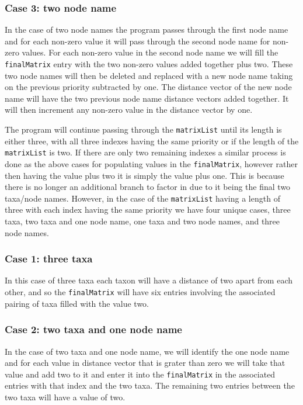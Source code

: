 \documentclass{article}
\begin{document}
\subsubsection{Case 3: two node name}
In the case of two node names the program passes through the first node name and for each non-zero value it will pass through the second node name for non-zero values. For each non-zero value in the second node name we will fill the {\tt finalMatrix} entry with the two non-zero values added together plus two. These two node names will then be deleted and replaced with a new node name taking on the previous priority subtracted by one. The distance vector of the new node name will have the two previous node name distance vectors added together. It will then increment any non-zero value in the distance vector by one. 

The program will continue passing through the {\tt matrixList} until its length is either three, with all three indexes having the same priority or if the length of the {\tt matrixList} is two. If there are only two remaining indexes a similar process is done as the above cases for populating values in the {\tt finalMatrix}, however rather then having the value plus two it is simply the value plus one. This is because there is no longer an additional branch to factor in due to it being the final two taxa/node names. 
However, in the case of the {\tt matrixList} having a length of three with each index having the same priority we have four unique cases, three taxa, two taxa and one node name, one taxa and two node names, and three node names. 

\subsubsection{Case 1: three taxa}

In this case of three taxa each taxon will have a distance of two apart from each other, and so the {\tt finalMatrix} will have six entries involving the associated pairing of taxa filled with the value two.

\subsubsection{Case 2: two taxa and one node name}

In the case of two taxa and one node name, we will identify the one node name and for each value in distance vector that is grater than zero we will take that value and add two to it and enter it into the {\tt finalMatrix} in the associated entries with that index and the two taxa. The remaining two entries between the two taxa will have a value of two.
\end{document}

